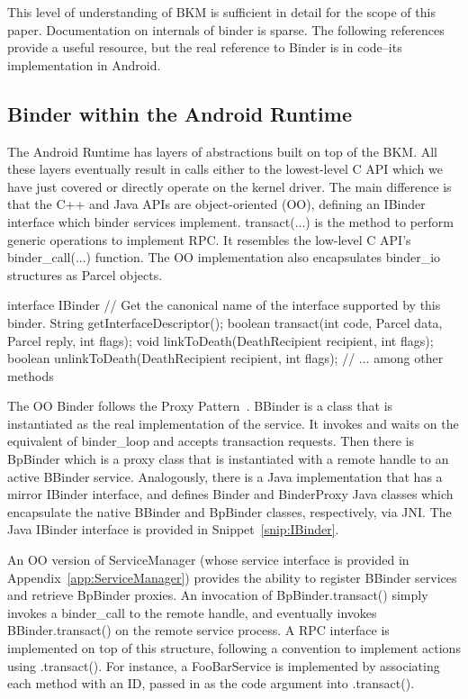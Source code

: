 \documentclass[prodmode]{acmlarge}
\begin{document}
This level of understanding of BKM is sufficient in detail for the scope of this paper. Documentation on internals of binder is sparse. The following references~\cite{BinderLinuxFoundation,BinderMastersThesis} provide a useful resource, but the real reference to Binder is in code--its implementation in Android.

\subsection{Binder within the Android Runtime}
The Android Runtime has layers of abstractions built on top of the BKM. All these layers eventually result in calls either to the lowest-level C API which we have just covered or directly operate on the kernel driver. The main difference is that the C++ and Java APIs are object-oriented (OO), defining an IBinder interface which binder services implement. transact(...) is the method to perform generic operations to implement RPC. It resembles the low-level C API's binder\_call(...) function. The OO implementation also encapsulates binder\_io structures as Parcel objects.

\begin{snippet}[label=snip:IBinder]
interface IBinder {
  // Get the canonical name of the interface supported by this binder.
  String getInterfaceDescriptor();
  boolean transact(int code, Parcel data, Parcel reply, int flags);
  void linkToDeath(DeathRecipient recipient, int flags);
  boolean unlinkToDeath(DeathRecipient recipient, int flags);
  // ... among other methods
}
\end{snippet}

The OO Binder follows the Proxy Pattern~\cite{ProxyPattern}. BBinder is a class that is instantiated as the real implementation of the service. It invokes and waits on the equivalent of binder\_loop and accepts transaction requests. Then there is BpBinder which is a proxy class that is instantiated with a remote handle to an active BBinder service. Analogously, there is a Java implementation that has a mirror IBinder interface, and defines Binder and BinderProxy Java classes which encapsulate the native BBinder and BpBinder classes, respectively, via JNI. The Java IBinder interface is provided in Snippet~\ref{snip:IBinder}.

An OO version of ServiceManager (whose service interface is provided in Appendix~\ref{app:ServiceManager}) provides the ability to register BBinder services and retrieve BpBinder proxies. An invocation of BpBinder.transact() simply invokes a binder\_call to the remote handle, and eventually invokes BBinder.transact() on the remote service process. A RPC interface is implemented on top of this structure, following a convention to implement actions using .transact(). For instance, a FooBarService is implemented by associating each method with an ID, passed in as the code argument into .transact().
\end{document}
